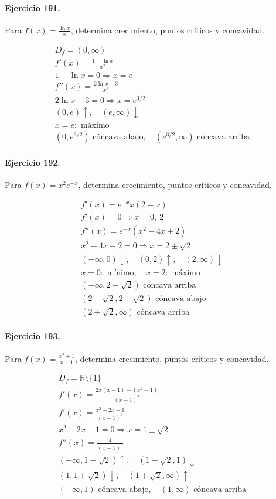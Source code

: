 \documentclass[11pt,a4paper]{article}
\begin{document}
\paragraph{Ejercicio 191.} Para $f(x)=\frac{\ln x}{x}$, determina crecimiento, puntos críticos y concavidad.

\[
\begin{aligned}
D_f=(0,\infty)\\
f'(x)=\frac{1-\ln x}{x^2}\\
1-\ln x=0\Rightarrow x=e\\
f''(x)=\frac{2\ln x-3}{x^3}\\
2\ln x-3=0\Rightarrow x=e^{3/2}\\
(0,e)\uparrow,\quad(e,\infty)\downarrow\\
x=e:\text{{ máximo}}\\
(0,e^{3/2})\text{{ cóncava abajo}},\quad(e^{3/2},\infty)\text{{ cóncava arriba}}
\end{aligned}
\]


\paragraph{Ejercicio 192.} Para $f(x)=x^2e^{-x}$, determina crecimiento, puntos críticos y concavidad.

\[
\begin{aligned}
f'(x)=e^{-x}x(2-x)\\
f'(x)=0\Rightarrow x=0,\ 2\\
f''(x)=e^{-x}(x^2-4x+2)\\
x^2-4x+2=0\Rightarrow x=2\pm\sqrt2\\
(-\infty,0)\downarrow,\quad(0,2)\uparrow,\quad(2,\infty)\downarrow\\
x=0:\text{{ mínimo}},\quad x=2:\text{{ máximo}}\\
(-\infty,2-\sqrt2)\text{{ cóncava arriba}}\\
(2-\sqrt2,2+\sqrt2)\text{{ cóncava abajo}}\\
(2+\sqrt2,\infty)\text{{ cóncava arriba}}
\end{aligned}
\]


\paragraph{Ejercicio 193.} Para $f(x)=\frac{x^2+1}{x-1}$, determina crecimiento, puntos críticos y concavidad.

\[
\begin{aligned}
D_f=\mathbb{R}\setminus\{1\}\\
f'(x)=\frac{2x(x-1)-(x^2+1)}{(x-1)^2}\\
f'(x)=\frac{x^2-2x-1}{(x-1)^2}\\
x^2-2x-1=0\Rightarrow x=1\pm\sqrt2\\
f''(x)=\frac{4}{(x-1)^3}\\
(-\infty,1-\sqrt2)\uparrow,\quad(1-\sqrt2,1)\downarrow\\
(1,1+\sqrt2)\downarrow,\quad(1+\sqrt2,\infty)\uparrow\\
(-\infty,1)\text{{ cóncava abajo}},\quad(1,\infty)\text{{ cóncava arriba}}
\end{aligned}
\]
\end{document}
